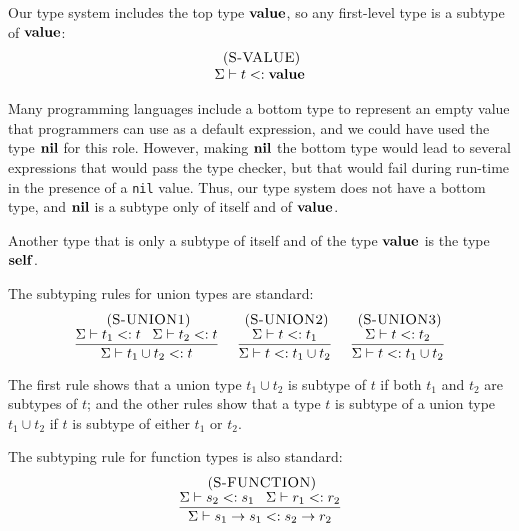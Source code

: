 Our type system includes the top type $\mathbf{value}$,
so any first-level type is a subtype of $\mathbf{value}$:
\[
\begin{array}{c}
\; (\textsc{S-VALUE})\\
\Sigma \vdash t <: \mathbf{value}
\end{array}
\]

Many programming languages include a bottom type to represent
an empty value that programmers can use as a default expression,
and we could have used the type $\mathbf{nil}$ for this role.
However, making $\mathbf{nil}$ the bottom type would lead to several expressions
that would pass the type checker, but that would fail during run-time
in the presence of a \texttt{nil} value.
Thus, our type system does not have a bottom type, and $\mathbf{nil}$ is a
subtype only of itself and of $\mathbf{value}$.

Another type that is only a subtype of itself and of the type $\mathbf{value}$
is the type $\mathbf{self}$.

The subtyping rules for union types are standard:
\[
\begin{array}{c}
\begin{array}{c}
\; (\textsc{S-UNION1})\\
\dfrac{\Sigma \vdash t_{1} <: t \;\;\;
       \Sigma \vdash t_{2} <: t}
      {\Sigma \vdash t_{1} \cup t_{2} <: t}
\end{array}
\;
\begin{array}{c}
\; (\textsc{S-UNION2})\\
\dfrac{\Sigma \vdash t <: t_{1}}
      {\Sigma \vdash t <: t_{1} \cup t_{2}}
\end{array}
\;
\begin{array}{c}
\; (\textsc{S-UNION3})\\
\dfrac{\Sigma \vdash t <: t_{2}}
      {\Sigma \vdash t <: t_{1} \cup t_{2}}
\end{array}
\end{array}
\]

The first rule shows that a union type $t_{1} \cup t_{2}$
is subtype of $t$ if both $t_{1}$ and $t_{2}$ are subtypes
of $t$;
and the other rules show that a type $t$ is subtype
of a union type $t_{1} \cup t_{2}$ if $t$ is subtype of
either $t_{1}$ or $t_{2}$.

The subtyping rule for function types is also standard:
\[
\begin{array}{c}
\; (\textsc{S-FUNCTION})\\
\dfrac{\Sigma \vdash s_{2} <: s_{1} \;\;\;
       \Sigma \vdash r_{1} <: r_{2}}
      {\Sigma \vdash s_{1} \rightarrow s_{1} <: s_{2} \rightarrow r_{2}}
\end{array}
\]

